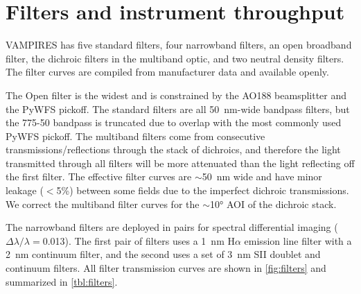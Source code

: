 \section{Filters and instrument throughput}\label{sec:filters}

VAMPIRES has five standard filters, four narrowband filters, an open broadband filter, the dichroic filters in the multiband optic, and two neutral density filters. The filter curves are compiled from manufacturer data and available openly. 

The Open filter is the widest and is constrained by the AO188 beamsplitter and the PyWFS pickoff. The standard filters are all \SI{50}{\nm}-wide bandpass filters, but the 775-50 bandpass is truncated due to overlap with the most commonly used PyWFS pickoff. The multiband filters come from consecutive transmissions/reflections through the stack of dichroics, and therefore the light transmitted through all filters will be more attenuated than the light reflecting off the first filter. The effective filter curves are $\sim$\SI{50}{\nm} wide and have minor leakage ($<$5\%) between some fields due to the imperfect dichroic transmissions. We correct the multiband filter curves for the $\sim$\ang{10} AOI of the dichroic stack.

The narrowband filters are deployed in pairs for spectral differential imaging ($\Delta\lambda/\lambda=$\num{0.013}). The first pair of filters uses a \SI{1}{\nm} H$\alpha$ emission line filter with a \SI{2}{\nm} continuum filter, and the second uses a set of \SI{3}{\nm} SII doublet and continuum filters. All filter transmission curves are shown in \autoref{fig:filters} and summarized in \autoref{tbl:filters}.


